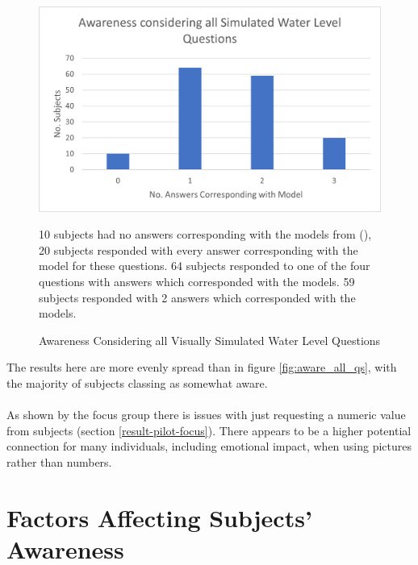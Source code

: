 \begin{figure}[H]
    \centering
    \includegraphics{fig_results/Awareness_ all_simulation_pictures_qs.png}
    \caption{Awareness Considering all Visually Simulated Water Level Questions}{ 10 subjects had no answers corresponding with the models from (\cite{kartverket_se_2021}), 20 subjects responded with every answer corresponding with the model for these questions. 64 subjects responded to one of the four questions with answers which corresponded with the models. 59 subjects responded with 2 answers which corresponded with the models. }
    \label{fig:aware_all_edited_photo}
\end{figure}


The results here are more evenly spread than in figure \ref{fig:aware_all_qs}, with the majority of subjects classing as somewhat aware. 
\paragraph{}
 


\paragraph{}
As shown by the focus group there is issues with just requesting a numeric value from subjects (section \ref{result-pilot-focus}). There appears to be a higher potential connection for many individuals, including emotional impact, when using pictures rather than numbers. 

\section{Factors Affecting Subjects' Awareness}
  

